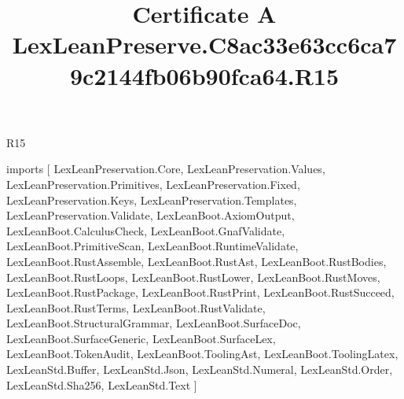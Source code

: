 \begin{lexlean}{R15}
\title{Certificate A LexLeanPreserve.C8ac33e63cc6ca79c2144fb06b90fca64.R15}
\begin{coremodule}
imports [
  LexLeanPreservation.Core,
  LexLeanPreservation.Values,
  LexLeanPreservation.Primitives,
  LexLeanPreservation.Fixed,
  LexLeanPreservation.Keys,
  LexLeanPreservation.Templates,
  LexLeanPreservation.Validate,
  LexLeanBoot.AxiomOutput,
  LexLeanBoot.CalculusCheck,
  LexLeanBoot.GnafValidate,
  LexLeanBoot.PrimitiveScan,
  LexLeanBoot.RuntimeValidate,
  LexLeanBoot.RustAssemble,
  LexLeanBoot.RustAst,
  LexLeanBoot.RustBodies,
  LexLeanBoot.RustLoops,
  LexLeanBoot.RustLower,
  LexLeanBoot.RustMoves,
  LexLeanBoot.RustPackage,
  LexLeanBoot.RustPrint,
  LexLeanBoot.RustSucceed,
  LexLeanBoot.RustTerms,
  LexLeanBoot.RustValidate,
  LexLeanBoot.StructuralGrammar,
  LexLeanBoot.SurfaceDoc,
  LexLeanBoot.SurfaceGeneric,
  LexLeanBoot.SurfaceLex,
  LexLeanBoot.TokenAudit,
  LexLeanBoot.ToolingAst,
  LexLeanBoot.ToolingLatex,
  LexLeanStd.Buffer,
  LexLeanStd.Json,
  LexLeanStd.Numeral,
  LexLeanStd.Order,
  LexLeanStd.Sha256,
  LexLeanStd.Text
]


\end{coremodule}
\end{lexlean}
